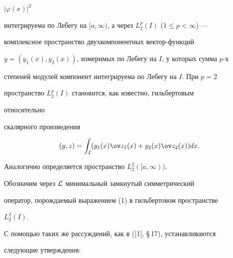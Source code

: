 $|\varphi(x)|^2$ 


интегрируема по Лебегу на $[a,\infty)$, а через $L^p_2(I)$ ($1\le 


p<\infty$) ---


комплексное пространство двухкомпонентных вектор-функций 


$y=(y_1(x),y_2(x))$, измеримых по Лебегу на $I$, у которых сумма $p$-х 


степеней модулей компонент интегрируема по Лебегу на $I$. При $p=2$ 


пространство $L^p_2(I)$ становится, как известно, гильбертовым 


относительно 


скалярного произведения 


$$ 


(y,z)=\int_I(y_1(x)\ov z_1(x)+y_2(x)\ov z_2(x))dx. 


$$ 


Аналогично определяется пространство $L^2_2([a,\infty))$. 


 


Обозначим через $\cal L$ минимальный замкнутый симметрический 


оператор, порождаемый выражением (1) в гильбертовом пространстве 


$L^2_2(I)$. 


 


С помощью таких же рассуждений, как в ([1], \S\,17), устанавливаются 


следующие утверждения: 


